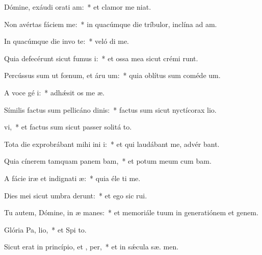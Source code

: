 \item Dómine, exáudi orati am:~* et clamor me   niat.
\item Non avértas fáciem   me:~* in quacúmque die tríbulor, inclína ad   am.
\item In quacúmque die invo te:~* veló di me.
\item Quia defecérunt sicut fumus  i:~* et ossa mea sicut crémi runt.
\item Percússus sum ut fœnum, et áru  um:~* quia oblítus sum coméde  um.
\item A voce gé i:~* adhǽsit os me  æ.
\item Símilis factus sum pellicáno dinis:~* factus sum sicut nyctícorax  lio.
\item {}vi,~* et factus sum sicut passer solitá  to.
\item Tota die exprobrábant mihi ini i:~* et qui laudábant me, advér  bant.
\item Quia cínerem tamquam panem bam,~* et potum meum cum  bam.
\item A fácie iræ et indignati æ:~* quia éle ti me.
\item Dies mei sicut umbra derunt:~* et ego sic  rui.
\item Tu autem, Dómine, in æ manes:~* et memoriále tuum in generatiónem et genem.
\item Glória Pa,  lio,~* et Spi to.
\item Sicut erat in princípio, et ,  per,~* et in sǽcula sæ. men.
